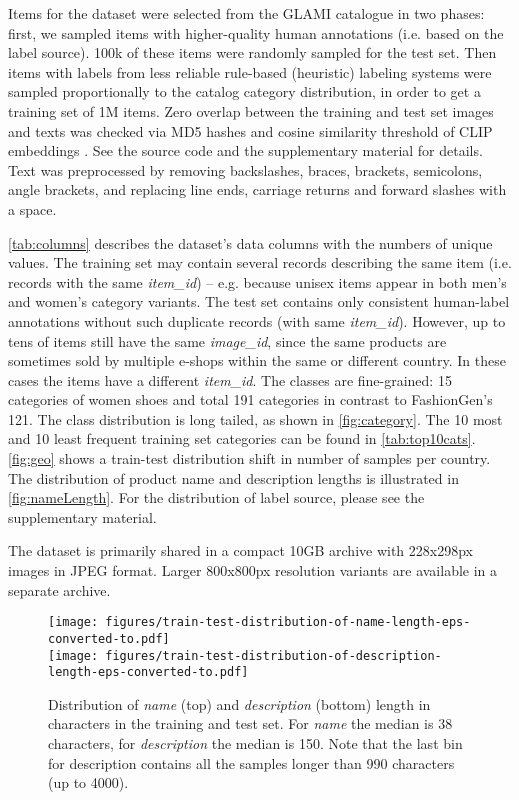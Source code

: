 \documentclass{bmvc2k}
\begin{document}
Items for the dataset were selected from the GLAMI catalogue in two phases: first, we sampled items with higher-quality human annotations (i.e. based on the label source). 100k of these items were randomly sampled for the test set.
Then items with labels from less reliable rule-based (heuristic) labeling systems were sampled proportionally to the catalog category distribution, in order to get a training set of 1M items. Zero overlap between the training and test set images and texts was checked via MD5 hashes and cosine similarity threshold of CLIP embeddings \cite{clip,mclip}. See the source code and the supplementary material for details. Text was preprocessed by removing backslashes, braces, brackets, semicolons, angle brackets, and replacing line ends, carriage returns and forward slashes with a space.

\autoref{tab:columns} describes the dataset's data columns with the numbers of unique values. The training set may contain several records describing the same item (i.e. records with the same \textit{item\_id}) -- e.g. because unisex items appear in both men's and women's category variants.
The test set contains only consistent human-label annotations without such duplicate records (with same \textit{item\_id}). However, up to tens of items still have the same \textit{image\_id}, since the same products are sometimes sold by multiple e-shops within the same or different country. In these cases the items have a different \textit{item\_id}. The classes are fine-grained: 15 categories of women shoes and total 191 categories in contrast to FashionGen's 121. The class distribution is long tailed, as shown in \autoref{fig:category}. The 10 most and 10 least frequent training set categories can be found in \autoref{tab:top10cats}. \autoref{fig:geo} shows a train-test distribution shift in number of samples per country. The distribution of product name and description lengths is illustrated in  \autoref{fig:nameLength}.  For the distribution of label source, please see the supplementary material.  

The dataset is primarily shared in a compact 10GB archive with 228x298px images in JPEG format. Larger 800x800px resolution variants are available in a separate archive. 








\begin{figure}[thb]
\centering
\texttt{[image: figures/train-test-distribution-of-name-length-eps-converted-to.pdf]}\\
\texttt{[image: figures/train-test-distribution-of-description-length-eps-converted-to.pdf]}
\vspace*{-2mm}
\caption{Distribution of \textit{name} (top) and \textit{description} (bottom) length in characters in the training and test set. For \textit{name} the median is 38 characters, 
for \textit{description} the median is 150. Note that the last bin for description contains all the samples longer than 990 characters (up to 4000).}
\label{fig:nameLength}
\end{figure}
\end{document}
